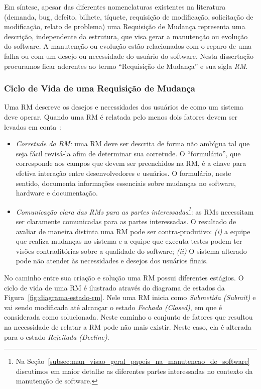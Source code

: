Em síntese, apesar das diferentes nomenclaturas existentes na literatura
(demanda, bug, defeito, bilhete, tíquete, requisição de modificação, solicitação
de modificação, relato de problema) uma Requisição de Mudança representa uma
descrição, independente da estrutura, que visa gerar a manutenção ou evolução do
software. A manutenção ou evolução estão relacionados com o reparo de uma falha
ou com um desejo ou necessidade do usuário do software. Nesta dissertação
procuramos ficar aderentes ao termo ``Requisição de Mudança'' e sua sigla
\textit{RM}.

\subsubsection{Ciclo de Vida de uma Requisição de Mudança}\label{sub:fluxo_de_trabalho_requisicao_mudanca}

Uma RM descreve os desejos e necessidades dos usuários de como um sistema deve
operar. Quando uma RM é relatada pelo menos dois fatores devem ser levados em
conta~\cite{tripathy2014software}:

\begin{itemize}
    \item \textit{Corretude da RM:} uma RM deve ser descrita de forma não
        ambígua tal que seja fácil revisá-la afim de determinar sua corretude.
        O ``formulário'', que corresponde aos campos que devem ser preenchidos
        na RM, é a chave para efetiva interação entre desenvolvedores e
        usuários. O formulário, neste sentido, documenta informações essenciais
        sobre mudanças no software, hardware e documentação.
   \item \textit{Comunicação clara das RMs para as partes
           interessadas\footnote{Na
               Seção~\ref{subsec:man_visao_geral_papeis_na_manutencao_de_software}
               discutimos em maior detalhe as diferentes partes interessadas
               no contexto da manutenção de software.}}: as RMs necessitam ser
       claramente comunicadas para as partes interessadas. O resultado de
       avaliar de maneira distinta uma RM pode ser contra-produtivo:
       \textit{(i)} a equipe que realiza mudanças no sistema e a equipe que
       executa testes podem ter visões contraditórias sobre a qualidade do
       software; \textit{(ii)} O sistema alterado pode não atender às
       necessidades e desejos dos usuários finais.
\end{itemize}

No caminho entre sua criação e solução uma RM possui diferentes estágios. O
ciclo de vida de uma RM é ilustrado através do diagrama de estados da
Figura~\ref{fig:diagrama-estado-rm}. Nele uma RM inicia como \textit{Submetida
    (Submit)} e vai sendo modificada até alcançar o estado \textit{Fechada
    (Closed)}, em que é considerada como solucionada. Neste caminho o conjunto
de fatores que resultou na necessidade de relatar a RM pode não mais existir.
Neste caso, ela é alterada para o estado \textit{Rejeitada (Decline)}.


